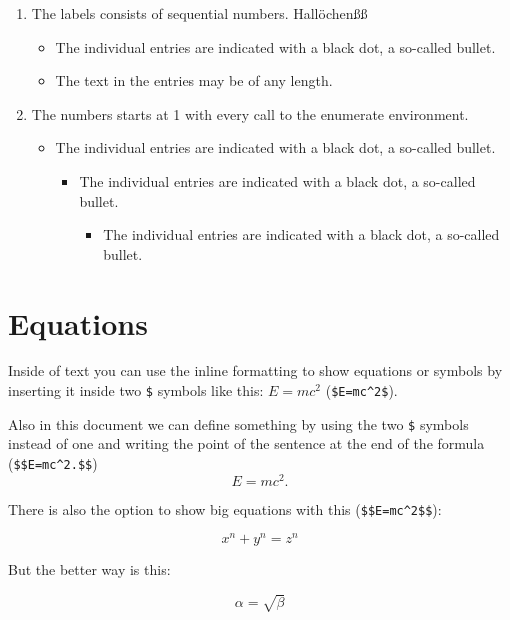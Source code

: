 \documentclass{article}				%
\begin{document}
\begin{enumerate}
	\item The labels consists of sequential numbers. Hallöchenßß
	\begin{itemize}
		\item The individual entries are indicated with a black dot, a so-called bullet.
		\item The text in the entries may be of any length.
	\end{itemize}
	\item The numbers starts at 1 with every call to the enumerate environment.
	\begin{itemize}
		\item The individual entries are indicated with a black dot, a so-called bullet.
		\begin{itemize}
			\item The individual entries are indicated with a black dot, a so-called bullet.
			\begin{itemize}
				\item The individual entries are indicated with a black dot, a so-called bullet.
			\end{itemize}
		\end{itemize}
	\end{itemize}
\end{enumerate}

\section{Equations}

Inside of text you can use the inline formatting to show equations or symbols by inserting it inside two \verb|$| symbols like this: $E=mc^2$ (\verb|$E=mc^2$|).

\vspace{5mm}

Also in this document we can define something by using the two \verb|$| symbols instead of one and writing the point of the sentence at the end of the formula (\verb|$$E=mc^2.$$|)  $$E=mc^2.$$

\vspace{5mm}

There is also the option to show big equations with this (\verb|$$E=mc^2$$|):

$$x^n+y^n=z^n$$

But the better way is this:

\begin{equation}
\label{simple_equation}
\alpha = \sqrt{ \beta }
\end{equation}
\end{document}
